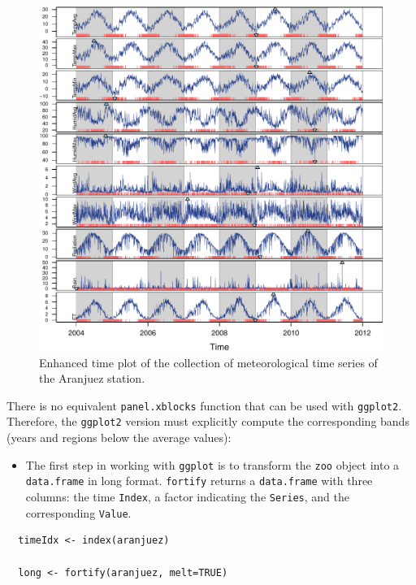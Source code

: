 \documentclass[smallroyalvopaper]{memoir}
\begin{document}
\begin{figure}[htbp]
\centering
\includegraphics[width=.9\linewidth]{figs/aranjuezXblocks.pdf}
\caption{\label{fig:org1d68c01}
Enhanced time plot of the collection of meteorological time series of the Aranjuez station.}
\end{figure}

There is no equivalent \texttt{panel.xblocks} function that can be used with
\texttt{ggplot2}. Therefore, the \texttt{ggplot2} version must explicitly compute
the corresponding bands (years and regions below the average values):

\begin{itemize}
\item The first step in working with \texttt{ggplot} is to transform the \texttt{zoo}
object into a \texttt{data.frame} in long format. \texttt{fortify} returns a
\texttt{data.frame} with three columns: the time \texttt{Index}, a factor
indicating the \texttt{Series}, and the corresponding \texttt{Value}.
\end{itemize}
\lstset{language=r,label= ,caption= ,captionpos=b,numbers=none}
\begin{lstlisting}
  timeIdx <- index(aranjuez)
  
  long <- fortify(aranjuez, melt=TRUE)
\end{lstlisting}
\end{document}

